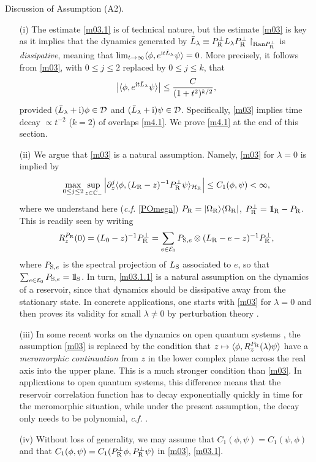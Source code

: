 \documentclass[letterpaper,onecolumn,11pt,accepted=2021-12-09]{quantumarticle}
\numberwithin{equation}{section}
\renewcommand{\r}{{\rm R}}
\newcommand{\s}{{\rm S}}
\renewcommand{\i}{{\rm i}}
\newcommand{\bbbone}{\mathchoice {\rm 1\mskip-4mu l} {\rm 1\mskip-4mu l}
	{\rm 1\mskip-4.5mu l} {\rm 1\mskip-5mu l}}
\begin{document}
\noindent
Discussion of Assumption (A2).
\begin{itemize} 
\item[(i)] The estimate \eqref{m03.1} is of technical nature, but the estimate \eqref{m03} is key as it implies that the dynamics generated by $\bar L_\lambda\equiv P^\perp_\r L_\lambda P^\perp_\r\upharpoonright_{{\rm Ran}P^\perp_\r}$  is {\em dissipative}, meaning that  $\lim_{t\rightarrow\infty}\langle \phi, e^{\i t \bar L_\lambda}\psi\rangle=0$. More precisely, it follows from \eqref{m03}, with $0\le j\le 2$ replaced by $0\le j\le k$, that 
\begin{equation}
	\big|\langle \phi, e^{\i t \bar L_\lambda} \psi\rangle\big| \le \frac{C}{(1+t^2)^{k/2}},
	\label{m4.1}
\end{equation}
provided $(\bar L_\lambda+\i)\phi\in {\mathcal D}$ and $(\bar L_\lambda+\i)\psi\in{\mathcal D}$. Specifically, \eqref{m03} implies time decay $\propto t^{-2}$ ($k=2$) of overlaps \eqref{m4.1}. We prove \eqref{m4.1} at the end of this section. 

\item[(ii)] We argue that \eqref{m03} is a natural assumption. Namely, \eqref{m03} for $\lambda=0$ is implied by
\begin{equation}	
\max_{0\le j\le 2}\sup_{z\in{\mathbb C}_-}\Big| \partial_z^j \langle\phi, (L_\r -z )^{-1} P_\r^\perp  \psi\rangle_{{\mathcal H}_\r}\Big| \le C_1(\phi,\psi)<\infty,
\label{m03.1.1}
\end{equation}
where we understand here ({\em c.f.} \eqref{POmega}) $P_\r=|\Omega_\r\rangle\langle\Omega_\r|$, $P_\r^\perp=\bbbone_\r-P_\r$. This is readily seen by writing 
$$
R_z^{P_\r}(0) = (L_0-z)^{-1} P^\perp_\r = \sum_{e\in{\mathcal E}_0} P_{\s,e}\otimes (L_\r-e-z)^{-1} P^\perp_\r,
$$
where $P_{\s,e}$ is the spectral projection of $L_\s$ associated to $e$, so that $\sum_{e\in{\mathcal E}_0}P_{\s,e}=\bbbone_\s$. In turn, \eqref{m03.1.1} is a natural assumption on the dynamics of a reservoir, since that dynamics should be dissipative away from the stationary state. In concrete applications, one starts with \eqref{m03} for $\lambda=0$ and then proves its validity for small $\lambda\neq 0$ by perturbation theory \cite{Markov2}. 


\item[(iii)] In some recent works on the dynamics on open quantum systems \cite{KM2,MAOP}, the assumption \eqref{m03} is replaced by the condition that $z\mapsto \langle\phi, R^{P_\r}_z(\lambda) \psi\rangle$ have a {\em meromorphic continuation} from $z$ in the lower complex plane across the real axis into the upper plane. This is a much stronger condition than \eqref{m03}. In applications to open quantum systems, this difference means that the reservoir correlation function has to decay exponentially quickly in time for the  meromorphic situation, while under the present assumption, the decay only needs to be polynomial, {\em c.f.} \cite{Markov2}. 

\item[(iv)] Without loss of generality, we may assume that $C_1(\phi,\psi)=C_1(\psi,\phi)$ and that  $C_1(\phi,\psi)=C_1(P^\perp_\r\phi, P^\perp_\r\psi)$ in \eqref{m03}, \eqref{m03.1}.
\end{itemize}
\end{document}
